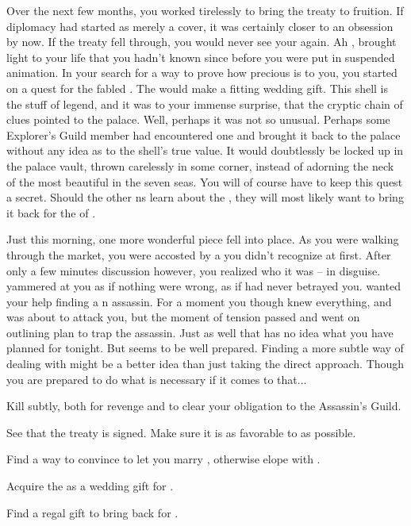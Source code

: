 \documentclass[char]{NeptuneBall}
\begin{document}
Over the next few months, you worked tirelessly to bring the treaty to fruition. If diplomacy had started as merely a cover, it was certainly closer to an obsession by now. If the treaty fell through, you would never see your \cPrincess{} again. Ah \cPrincess{}, \cPrincess{\they} brought light to your life that you hadn't known since before you were put in suspended animation. In your search for a way to prove how precious \cPrincess{} is to you, you started on a quest for the fabled \iGlowShell{\MYname}. The \iGlowShell{\MYname} would make a fitting wedding gift. This shell is the stuff of legend, and it was to your immense surprise, that the cryptic chain of clues pointed to the \pAtlantis{} palace. Well, perhaps it was not so unusual. Perhaps some Explorer's Guild member had encountered one and brought it back to the palace without any idea as to the shell's true value. It would doubtlessly be locked up in the palace vault, thrown carelessly in some corner, instead of adorning the neck of the most beautiful \cPrincess{\mer} in the seven seas. You will of course have to keep this quest a secret. Should the other \pPacifica{}ns learn about the \iGlowShell{}, they will most likely want to bring it back for the \cPacificanRuler{\King} of \pPacifica{}.

Just this morning, one more wonderful piece fell into place. As you were walking through the market, you were accosted by a \cQueen{\mer} you didn't recognize at first. After only a few minutes discussion however, you realized who it was -- \cQueen{} in disguise. \cQueen{\They} yammered at you as if nothing were wrong, as if \cQueen{\they} had never betrayed you. \cQueen{} wanted your help finding a \pPacifica{}n assassin. For a moment you though \cQueen{\they} knew everything, and was about to attack you, but the moment of tension passed and \cQueen{\they} went on outlining \cQueen{\them} plan to trap the assassin. Just as well that \cQueen{\they} has no idea what you have planned for \cQueen{\them} tonight. But \cQueen{\they} seems to be well prepared. Finding a more subtle way of dealing with \cQueen{\them} might be a better idea than just taking the direct approach. Though you are prepared to do what is necessary if it comes to that...

\begin{itemz}[Goals]
  \item Kill \cQueen{} subtly, both for revenge and to clear your obligation to the Assassin's Guild.
  \item See that the treaty is signed. Make sure it is as favorable to \pPacifica{} as possible.
  \item Find a way to convince \cKing{} to let you marry \cPrincess{}, otherwise elope with \cPrincess{}.  
  \item Acquire the \iGlowShell{} as a wedding gift for \cPrincess{}.
  \item Find a regal gift to bring back for \cPacificanRuler{}.
\end{itemz}
\end{document}
